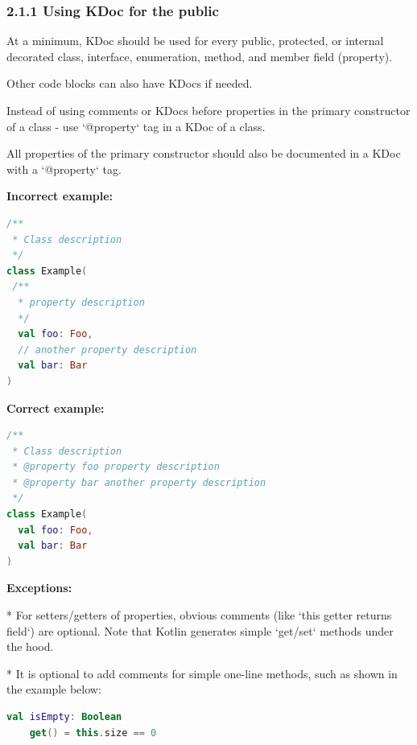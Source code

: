 \subsubsection*{\textbf{2.1.1 Using KDoc for the public}}
\leavevmode\newline

\label{sec:2.1.1}



At a minimum, KDoc should be used for every public, protected, or internal decorated class, interface, enumeration, method, and member field (property).

Other code blocks can also have KDocs if needed.

Instead of using comments or KDocs before properties in the primary constructor of a class - use `@property` tag in a KDoc of a class.

All properties of the primary constructor should also be documented in a KDoc with a `@property` tag.





\textbf{Incorrect example:}

\begin{lstlisting}[language=Kotlin]
/**
 * Class description
 */
class Example(
 /**
  * property description
  */
  val foo: Foo,
  // another property description
  val bar: Bar
)
\end{lstlisting}


\textbf{Correct example:}

\begin{lstlisting}[language=Kotlin]
/**
 * Class description
 * @property foo property description
 * @property bar another property description
 */
class Example(
  val foo: Foo,
  val bar: Bar
)
\end{lstlisting}


\textbf{Exceptions:}



* For setters/getters of properties, obvious comments (like `this getter returns field`) are optional. Note that Kotlin generates simple `get/set` methods under the hood.

   

* It is optional to add comments for simple one-line methods, such as shown in the example below:

\begin{lstlisting}[language=Kotlin]
val isEmpty: Boolean
    get() = this.size == 0
\end{lstlisting}


